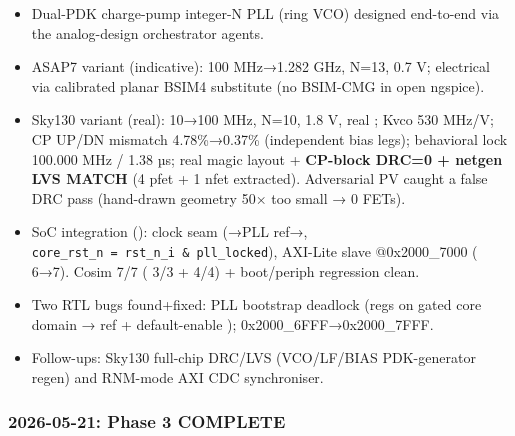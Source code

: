 \begin{record}

\begin{itemize}
\tightlist
\item
  \ok{} Dual-PDK charge-pump integer-N PLL (ring VCO) designed
  end-to-end via the analog-design orchestrator agents.
\item
  \ok{} ASAP7 variant (indicative): 100 MHz→1.282 GHz, N=13, 0.7 V;
  electrical via calibrated planar BSIM4 substitute (no BSIM-CMG in open
  ngspice).
\item
  \ok{} Sky130 variant (real): 10→100 MHz, N=10, 1.8 V, real
  ; Kvco 530 MHz/V; CP UP/DN mismatch 4.78\%→0.37\%
  (independent bias legs); behavioral lock 100.000 MHz / 1.38 µs; real
  magic layout + \textbf{CP-block DRC=0 + netgen LVS MATCH} (4 pfet + 1
  nfet extracted). Adversarial PV caught a false DRC pass (hand-drawn
  geometry 50× too small → 0 FETs).
\item
  \ok{} SoC integration (): clock seam
  (→PLL ref→,
  \texttt{core\_\allowbreak{}rst\_\allowbreak{}n\ =\allowbreak{}\ rst\_\allowbreak{}n\_\allowbreak{}i\ \&\ pll\_\allowbreak{}locked}),
  AXI-Lite slave @0x2000\_\allowbreak{}7000 ( 6→7).
  Cosim 7/7 ( 3/3 +  4/4) +
  boot/\allowbreak{}periph regression clean.
\item
  \ok{} Two RTL bugs found+fixed: PLL bootstrap deadlock (regs on gated
  core domain → ref  + default-enable );
  0x2000\_\allowbreak{}6FFF→0x2000\_\allowbreak{}7FFF.
\item
  \hold{} Follow-ups: Sky130 full-chip DRC/LVS
  (VCO/\allowbreak{}LF/\allowbreak{}BIAS PDK-generator regen) and
  RNM-mode AXI CDC synchroniser.
\end{itemize}

\end{record}

\subsubsection{\texorpdfstring{2026-05-21: Phase 3 COMPLETE
\ok{}}{2026-05-21: Phase 3 COMPLETE }}\label{cr:status:phase-status:2026-05-21-phase-3-complete-white-check-mark}

